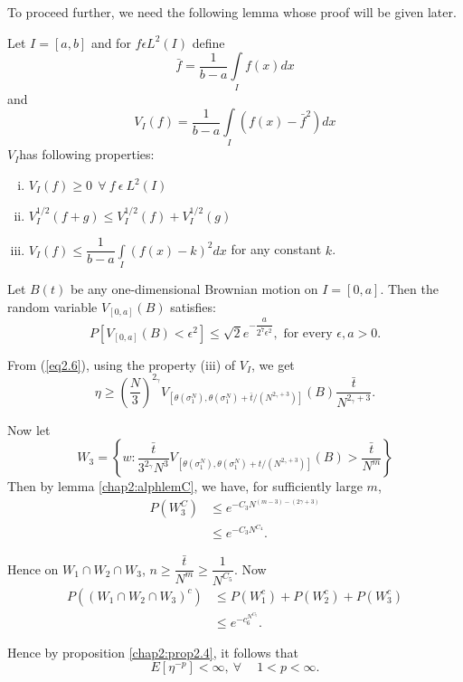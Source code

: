 To proceed further, we need the following lemma whose proof will be
given later. 
 
Let $I=[a,b]$ and for $f \epsilon  L^2(I)$ define
$$
\bar{f}=\frac{1}{b-a} \int\limits_I f(x)dx
$$
and
$$
V_I(f)=\frac{1}{b-a}\int\limits_I (f(x)-\bar{f}^2)dx
$$
$V_I$\pageoriginale has following properties:
\begin{enumerate}[(i)]
\item $V_I(f) \geq 0 ~~ \forall~ f ~\epsilon  ~L^2 (I)$

\item $V_I^{1/2}(f+g) \leq V_I^{1/2}(f) + V_I^{1/2}(g)$

\item $V_I(f) \leq \dfrac{1}{b-a} \int\limits_I (f(x) -k)^2 dx$ for
  any constant $k$. 
\end{enumerate}

\begin{alphlemma}\label{chap2:alphlemC}%
  Let $B(t)$ be any one-dimensional Brownian motion on $I=[0,
    a]$. Then the random variable $V_{[0, a]}(B)$ satisfies: 
  $$
  P\left[V_{[0, a]}(B) < \epsilon ^2\right] \leq \sqrt{2}e^{-\dfrac{a}{2^7
      \epsilon ^2}}, \text{  for every  }\epsilon , a > 0. 
  $$
\end{alphlemma}

From (\ref{eq2.6}), using the property (iii) of $V_I$, we get
$$
\eta \geq \left(\frac{N}{3}\right)^{2_\gamma }V_{\left[\theta (\sigma_1^N),
    \theta(\sigma_1^N)+
    \bar{t}/(N^{2_{\gamma}+3})\right]}{(B)\frac{\bar{t}}{N^{2
      _{\gamma}+3}}}.  
$$

Now let 
$$
W_3= \left\{ w:\frac{\bar{t}}{{3^{2_\gamma} N^3}} V_{[\theta
    (\sigma_1^N), \theta(\sigma_1^N)+t/(N^{{2_\gamma}+3})]} (B) >
\frac{\bar{t}}{N^m} \right\} 
$$
Then by lemma \ref{chap2:alphlemC}, we have, for sufficiently large $m$,
\begin{align*}
  P(W_3^C) &\leq e^{-C_3N^{(m-3)-(2 \gamma +3)}}\\
  &\leq e^{-C_3N^{C_4}}.
\end{align*}

Hence on $W_1 \cap W_2 \cap W_3$, $n \geq \dfrac{\bar{t}}{N^m} \geq
\dfrac{1}{N^{C_5}}$. Now 
\begin{align*}
  P((W_1 \cap W_2 \cap W_3)^c) &\leq P(W_1^c)+P(W_2^c)+P(W_3^c)\\
  &\leq e^{-c_6^{N^{C_7}}}.
\end{align*}

Hence by proposition \ref{chap2:prop2.4}, it follows that
$$
E[\eta^{-p}] < \infty, ~\forall~ \quad 1< p < \infty.
$$


